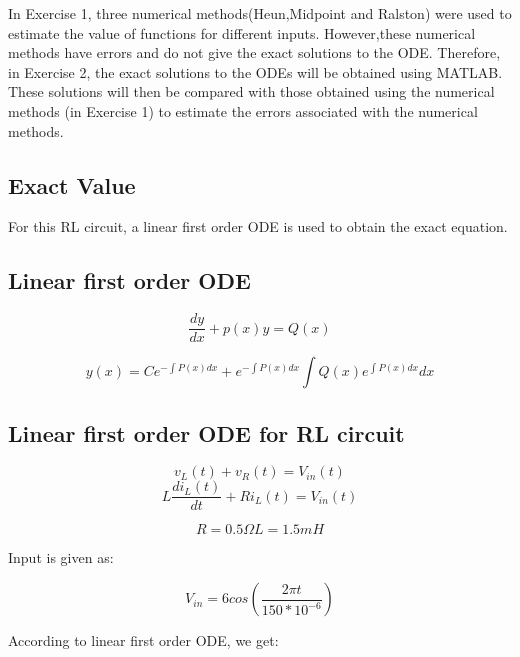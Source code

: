 \documentclass[11pt,a4paper]{article}
\begin{document}
\vspace{-2mm}In Exercise 1, three numerical methods(Heun,Midpoint and Ralston) were used to estimate the value of functions for different inputs. However,these numerical methods have errors and do not give the exact solutions to the ODE. Therefore, in Exercise 2, the exact solutions to the ODEs will be obtained using MATLAB. These solutions will then be compared with those obtained using the numerical methods (in Exercise 1) to estimate the errors associated with the numerical methods.

\subsection{Exact Value}

For this RL circuit, a linear first order ODE is used to obtain the exact equation.

\subsection{Linear first order ODE}

\begin{equation}
\frac{dy}{dx}+p(x)y=Q(x)
\end{equation}

\begin{equation}
y(x)=Ce^{-\int{P(x)dx}}+e^{-\int{P(x)dx}}\int{Q(x)e^{\int{P(x)dx}}dx}
\end{equation}

\subsection{Linear first order ODE for RL circuit}

\begin{equation}
v_L(t)+v_R(t)=V_{in}(t)
\end{equation}
\begin{equation}
L\frac{di_L(t)}{dt}+Ri_L(t)=V_{in}(t)
\end{equation}

\begin{equation}
R=0.5\Omega
L=1.5mH
\end{equation}

Input is given as:

\begin{equation}
V_{in}=6cos(\frac{2{\pi}t}{150*{10^{-6}}})
\end{equation}

According to linear first order ODE, we get:
\end{document}
